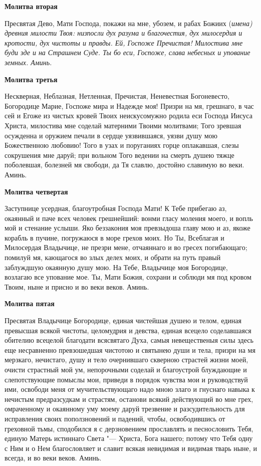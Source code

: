 \medskip\bfseries Молитва вторая\normalfont{}\nopagebreak


Пресвятая Дево, Мати Господа, покажи на мне, убозем, и рабах Божиих (\itshape имена\normalfont{}) древния милости Твоя: низпосли дух разума и благочестия, дух милосердия и кротости, дух чистоты и правды. Ей, Госпоже Пречистая! Милостива мне буди зде и на Страшнем Суде. Ты бо еси, Госпоже, слава небесных и упование земных. Аминь.


\medskip\bfseries Молитва третья\normalfont{}\nopagebreak


Нескверная, Неблазная, Нетленная, Пречистая, Неневестная Богоневесто, Богородице Марие, Госпоже мира и Надежде моя! Призри на мя, грешнаго, в час сей и Егоже из чистых кровей Твоих неискусомужно родила еси Господа Иисуса Христа, милостива мне соделай матерними Твоими молитвами; Того зревшая осужденна и оружием печали в сердце уязвившаяся, уязви душу мою Божественною любовию! Того в узах и поруганиях горце оплакавшая, слезы сокрушения мне даруй; при вольном Того ведении на смерть душею тяжце поболевшая, болезней мя свободи, да Тя славлю, достойно славимую во веки. Аминь.


\medskip\bfseries Молитва четвертая\normalfont{}\nopagebreak


Заступнице усердная, благоутробная Господа Мати! К Тебе прибегаю аз, окаянный и паче всех человек грешнейший: вонми гласу моления моего, и вопль мой и стенание услыши. Яко беззакония моя превзыдоша главу мою и аз, якоже корабль в пучине, погружаюся в море грехов моих. Но Ты, Всеблагая и Милосердая Владычице, не презри мене, отчаяннаго и во гресех погибающаго; помилуй мя, кающагося во злых делех моих, и обрати на путь правый заблуждшую окаянную душу мою. На Тебе, Владычице моя Богородице, возлагаю все упование мое. Ты, Мати Божия, сохрани и соблюди мя под кровом Твоим, ныне и присно и во веки веков. Аминь.


\medskip\bfseries Молитва пятая\normalfont{}\nopagebreak


Пресвятая Владычице Богородице, единая чистейшая душею и телом, единая превысшая всякой чистоты, целомудрия и девства, единая всецело соделавшаяся обителию всецелой благодати всясвятаго Духа, самыя невещественыя силы здесь еще несравненно превзошедшая чистотою и святынею души и тела, призри на мя мерзкаго, нечистаго, душу и тело очернившаго скверною страстей жизни моей, очисти страстный мой ум, непорочными соделай и благоустрой блуждающие и слепотствующие помыслы мои, приведи в порядок чувства мои и руководствуй ими, освободи меня от мучительствующаго надо мною злаго и гнуснаго навыка к нечистым предразсудкам и страстям, останови всякий действующий во мне грех, омраченному и окаянному уму моему даруй трезвение и разсудительность для исправления своих поползновений и падений, чтобы, освободившись от греховной тьмы, сподобился я с дерзновением прославлять и песнословить Тебя, единую Матерь истиннаго Света "--- Христа, Бога нашего; потому что Тебя одну с Ним и о Нем благословляет и славит всякая невидимая и видимая тварь ныне, и всегда, и во веки веков. Аминь.


